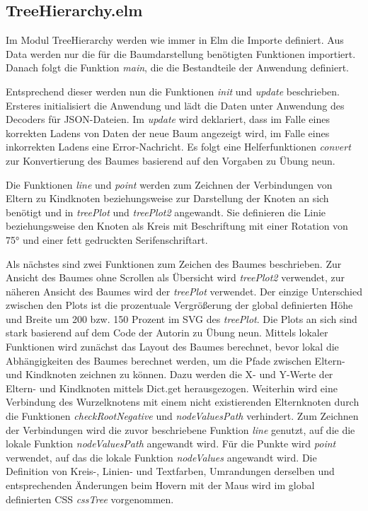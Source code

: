 \documentclass[usegeometry=true]{scrartcl}
\begin{document}
\subsection{TreeHierarchy.elm}
Im Modul TreeHierarchy werden wie immer in Elm die Importe definiert. Aus Data werden nur die für die Baumdarstellung benötigten Funktionen importiert. 
Danach folgt die Funktion \textit{main}, die die Bestandteile der Anwendung definiert. 

Entsprechend dieser werden nun die Funktionen \textit{init} und \textit{update} beschrieben. 
Ersteres initialisiert die Anwendung und lädt die Daten unter Anwendung des Decoders für JSON-Dateien. 
Im \textit{update} wird deklariert, dass im Falle eines korrekten Ladens von Daten der neue Baum angezeigt wird, im Falle eines inkorrekten Ladens eine Error-Nachricht. 
Es folgt eine Helferfunktionen \textit{convert} zur Konvertierung des Baumes basierend auf den Vorgaben zu Übung neun.

Die Funktionen \textit{line} und \textit{point} werden zum Zeichnen der Verbindungen von Eltern zu Kindknoten beziehungsweise zur Darstellung der Knoten an sich benötigt und in \textit{treePlot} und \textit{treePlot2} angewandt. 
Sie definieren die Linie beziehungsweise den Knoten als Kreis mit Beschriftung mit einer Rotation von 75° und einer fett gedruckten Serifenschriftart.

Als nächstes sind zwei Funktionen zum Zeichen des Baumes beschrieben. Zur Ansicht des Baumes ohne Scrollen als Übersicht wird \textit{treePlot2} verwendet, zur näheren Ansicht des Baumes wird der \textit{treePlot} verwendet. 
Der einzige Unterschied zwischen den Plots ist die prozentuale Vergrößerung der global definierten Höhe und Breite um 200 bzw. 150 Prozent im SVG des \textit{treePlot}.
Die Plots an sich sind stark basierend auf dem Code der Autorin zu Übung neun. Mittels lokaler Funktionen wird zunächst das Layout des Baumes berechnet, bevor lokal die Abhängigkeiten des Baumes berechnet werden, um die Pfade zwischen Eltern- und Kindknoten zeichnen zu können. 
Dazu werden die X- und Y-Werte der Eltern- und Kindknoten mittels Dict.get herausgezogen. Weiterhin wird eine Verbindung des Wurzelknotens mit einem nicht existierenden Elternknoten durch die Funktionen \textit{checkRootNegative} und \textit{nodeValuesPath} verhindert.
Zum Zeichnen der Verbindungen wird die zuvor beschriebene Funktion \textit{line} genutzt, auf die die lokale Funktion \textit{nodeValuesPath} angewandt wird. Für die Punkte wird \textit{point} verwendet, auf das die lokale Funktion \textit{nodeValues} angewandt wird. 
Die Definition von Kreis-, Linien- und Textfarben, Umrandungen derselben und entsprechenden Änderungen beim Hovern mit der Maus wird im global definierten CSS \textit{cssTree} vorgenommen. 
\end{document}
